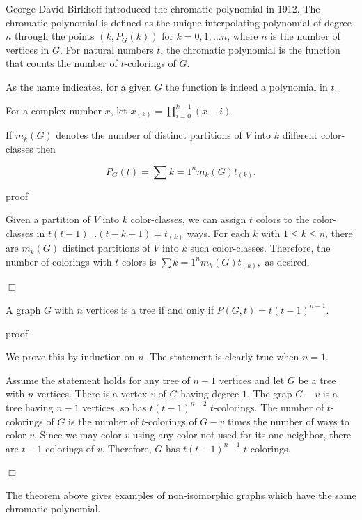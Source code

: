 George David Birkhoff introduced the chromatic polynomial in 1912.
The chromatic polynomial is defined as the unique interpolating
polynomial of degree $n$ through the points $(k,P_G(k))$ for 
$k=0,1,\dots n$, where $n$ is the number of vertices in $G$. 
For natural numbers $t$, the chromatic polynomial is the function 
that counts the
number of $t$-colorings of $G$.

As the name indicates, for a given $G$ the function is indeed a 
polynomial in $t$.

For a complex number $x$, let $x_{(k)}=\prod_{i=0}^{k-1} (x-i)$.

\begin{lemma}
If $m_k(G)$ denotes the number of distinct partitions of $V$
into $k$ different color-classes then

\[
P_G(t) = \sum{k=1}^n m_k(G)t_{(k)}.
\]
\end{lemma}


proof

Given a partition of $V$ into $k$ color-classes, we can assign 
$t$ colors to the color-classes in $t(t-1)\dots (t-k+1)=t_{(k)}$ ways.
For each $k$ with $1\leq k\leq n$, there are
$m_k(G)$ distinct partitions of $V$ into $k$ such color-classes.
Therefore, the number of colorings with $t$ colors is 
$ \sum{k=1}^n m_k(G)t_{(k)},$ as desired.

$\Box$



\begin{theorem}  
A graph $G$ with $n$ vertices is a tree if and only if $P(G, t) =
t(t-1)^{n-1}$.
\end{theorem}

proof

We prove this by induction on $n$. The statement is clearly
true when $n=1$. 

Assume the statement holds for any tree of $n-1$ vertices
and let $G$ be a tree with $n$ vertices. There is a vertex $v$ 
of $G$ having degree $1$. The grap $G-v$ is a tree having $n-1$
vertices, so has $t(t-1)^{n-2}$ $t$-colorings. The number of 
$t$-colorings of $G$ is the number of $t$-colorings of $G-v$ times the
number of ways to color $v$. Since we may color $v$ using any
color not used for its one neighbor, there are $t-1$ colorings of $v$.
Therefore, $G$ has $t(t-1)^{n-1}$ $t$-colorings. 

$\Box$

The theorem above gives examples of non-isomorphic graphs which have
the same chromatic polynomial.



